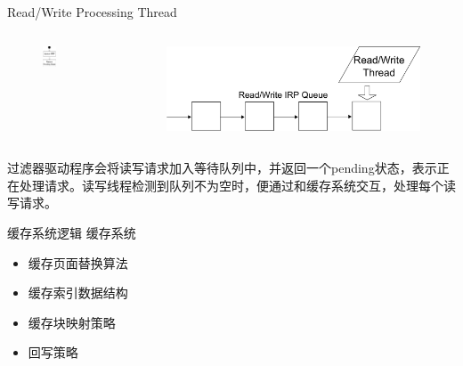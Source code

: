 \documentclass[compress]{beamer}
\begin{document}
\begin{frame}{Read/Write Processing Thread}
    \begin{columns}
    \begin{column}{0.5\textwidth}
        \begin{figure}
        \includegraphics[width=0.4\textwidth]{../graph/df-rw}
        \end{figure}
    \end{column}
    \begin{column}{0.5\textwidth}
        \begin{figure}
        \includegraphics[width=1.0\textwidth]{../graph/df-rw-thread}
        \end{figure}
    \end{column}
    \end{columns}
过滤器驱动程序会将读写请求加入等待队列中，并返回一个pending状态，表示正在处理请求。读写线程检测到队列不为空时，便通过和缓存系统交互，处理每个读写请求。
\end{frame}

\begin{frame}{缓存系统逻辑}
缓存系统
\begin{itemize}
\item 缓存页面替换算法
\item 缓存索引数据结构
\item 缓存块映射策略
\item 回写策略
\end{itemize}
\end{frame}
\end{document}
